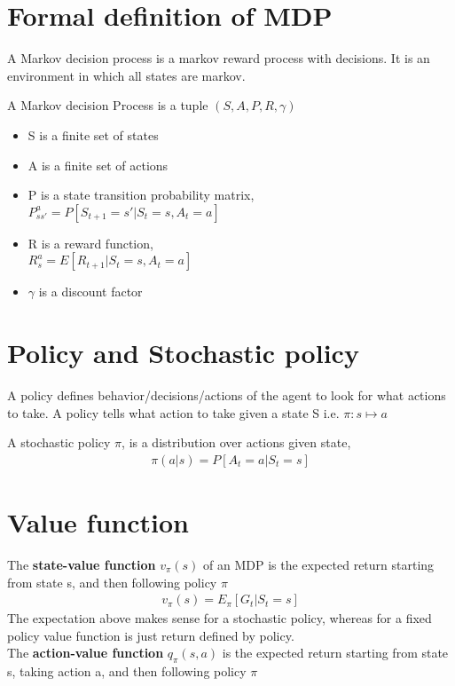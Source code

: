 \documentclass[10pt,a4paper]{article}
\begin{document}
\section{Formal definition of MDP}

A Markov decision process is a markov reward process with decisions. It is an environment in which all states are markov.

A Markov decision Process is a tuple $(S, A, P, R, \gamma)$
\begin{itemize}
	\item S is a finite set of states
	\item A is a finite set of actions
	\item P is a state transition probability matrix, \\
	$P^a_{ss'} = P[S_{t+1} = s' | S_t = s, A_t = a]$
	\item R is a reward function, \\
	$R_s^a = E[R_{t+1} | S_t = s, A_t = a]$
	\item $\gamma$ is a discount factor
\end{itemize}

\section{Policy and Stochastic policy}

A policy defines behavior/decisions/actions of the agent to look for what actions to take.
A policy tells what action to take given a state S i.e.
$\pi : s \mapsto a$

A stochastic policy $\pi$, is a
distribution over actions given state,
\begin{align}
	\pi(a|s) = P[A_t = a | S_t = s]
\end{align}

\section{Value function}
The \textbf{state-value function} $v_{\pi}(s)$ of an MDP is the expected return starting from state s, and then following policy $\pi$
\begin{align}
	v_{\pi}(s) = E_{\pi}[G_t | S_t = s]
\end{align}
The expectation above makes sense for a stochastic policy, whereas for a fixed policy value function is just return defined by policy. \\

The \textbf{action-value function}
$q_{\pi}(s,a)$ is the expected return
starting from state s, taking action a, and then following policy $\pi$
\end{document}
